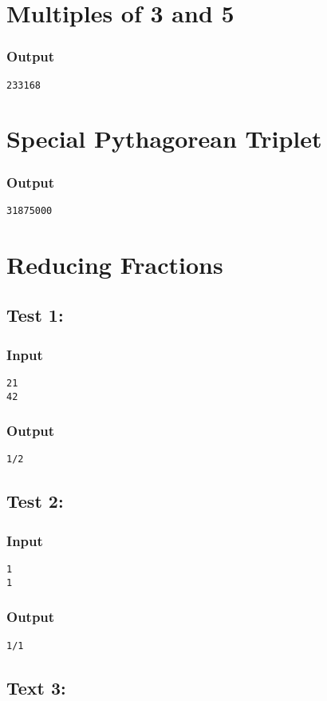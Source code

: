 \documentclass[twocolumn,9pt]{extarticle}
\begin{document}
\section{Multiples of 3 and 5}
\subsubsection*{Output}
\texttt{233168}

\section{Special Pythagorean Triplet}
\subsubsection*{Output}
\texttt{31875000}

\section{Reducing Fractions}
\subsection*{Test 1:}
\subsubsection*{Input}
\texttt{21\\42}

\subsubsection*{Output}
\texttt{1/2}

\subsection*{Test 2:}
\subsubsection*{Input}
\texttt{1\\1}

\subsubsection*{Output}
\texttt{1/1}

\subsection*{Text 3:}
\end{document}
